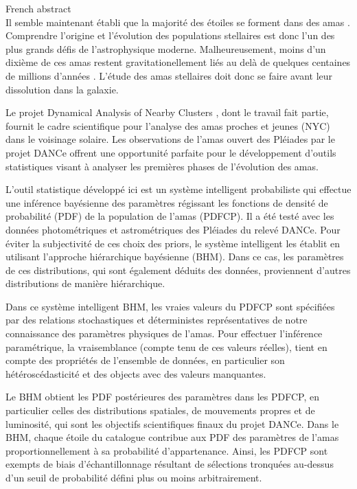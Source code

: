 {\LARGE French abstract}\\

Il semble maintenant établi que la majorité des étoiles se forment dans des amas \citep{2000AJ....120.3139C, 2003AJ....126.1916P,2003ARA&A..41...57L}. Comprendre l'origine et l'évolution des populations stellaires est donc l'un des plus grands défis de l'astrophysique moderne. Malheureusement, moins d'un dixième de ces amas restent gravitationellement liés au delà de quelques centaines de millions d'années \citep{2003ARA&A..41...57L}. L’étude des amas stellaires doit donc se faire avant leur dissolution dans la galaxie.

Le projet Dynamical Analysis of Nearby Clusters \cite[DANCe,][]{Bouy2013}, dont le travail fait partie, fournit le cadre scientifique pour l'analyse des amas proches et jeunes (NYC) dans le voisinage solaire. Les observations de l'amas ouvert des Pléiades par le projet DANCe offrent une opportunité parfaite pour le développement d'outils statistiques visant à analyser les premières phases de l'évolution des amas.

L'outil statistique développé ici est un système intelligent probabiliste qui effectue une inférence bayésienne des paramètres régissant les fonctions de densité de probabilité (PDF) de la population de l'amas (PDFCP). Il a été testé avec les données photométriques et astrométriques des Pléiades du relevé DANCe. Pour éviter la subjectivité de ces choix des priors, le système intelligent les établit en utilisant l'approche hiérarchique bayésienne (BHM). Dans ce cas, les paramètres de ces distributions, qui sont également déduits des données, proviennent d'autres distributions de manière hiérarchique.

Dans ce système intelligent BHM, les vraies valeurs du PDFCP sont spécifiées par des relations stochastiques et déterministes représentatives de notre connaissance des paramètres physiques de l'amas. Pour effectuer l'inférence paramétrique, la vraisemblance (compte tenu de ces valeurs réelles), tient en compte des propriétés de l'ensemble de données, en particulier son hétéroscédasticité et des objects avec des valeurs manquantes.

Le BHM obtient les PDF postérieures des paramètres dans les PDFCP, en particulier celles des distributions spatiales, de mouvements propres et de luminosité, qui sont les objectifs scientifiques finaux du projet DANCe. Dans le BHM, chaque étoile du catalogue contribue aux PDF des paramètres de l'amas proportionnellement à sa probabilité d'appartenance. Ainsi, les PDFCP sont exempts de biais d'échantillonnage résultant de sélections tronquées au-dessus d'un seuil de probabilité défini plus ou moins arbitrairement.

